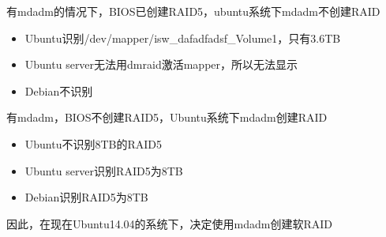 有mdadm的情况下，BIOS已创建RAID5，ubuntu系统下mdadm不创建RAID
\begin{itemize}
\item Ubuntu识别/dev/mapper/isw_dafadfadsf_Volume1，只有3.6TB 
\item Ubuntu server无法用dmraid激活mapper，所以无法显示
\item Debian不识别
\end{itemize}

有mdadm，BIOS不创建RAID5，Ubuntu系统下mdadm创建RAID
\begin{itemize}
\item Ubuntu不识别8TB的RAID5
\item Ubuntu server识别RAID5为8TB
\item Debian识别RAID5为8TB
\end{itemize}

因此，在现在Ubuntu14.04的系统下，决定使用mdadm创建软RAID

